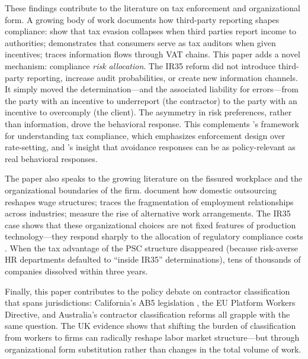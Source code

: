 \documentclass[12pt]{article}
\begin{document}
These findings contribute to the literature on tax enforcement and organizational form. A growing body of work documents how third-party reporting shapes compliance: \citet{kleven2011} show that tax evasion collapses when third parties report income to authorities; \citet{naritomi2019} demonstrates that consumers serve as tax auditors when given incentives; \citet{pomeranz2015} traces information flows through VAT chains. This paper adds a novel mechanism: compliance \textit{risk allocation}. The IR35 reform did not introduce third-party reporting, increase audit probabilities, or create new information channels. It simply moved the determination---and the associated liability for errors---from the party with an incentive to underreport (the contractor) to the party with an incentive to overcomply (the client). The asymmetry in risk preferences, rather than information, drove the behavioral response. This complements \citet{slemrod2019}'s framework for understanding tax compliance, which emphasizes enforcement design over rate-setting, and \citet{chetty2009}'s insight that avoidance responses can be as policy-relevant as real behavioral responses.

The paper also speaks to the growing literature on the fissured workplace and the organizational boundaries of the firm. \citet{goldschmidt2017} document how domestic outsourcing reshapes wage structures; \citet{weil2014} traces the fragmentation of employment relationships across industries; \citet{katz2019} measure the rise of alternative work arrangements. The IR35 case shows that these organizational choices are not fixed features of production technology---they respond sharply to the allocation of regulatory compliance costs \citep[see also][on the elasticity of organizational form to tax incentives]{djankov2010}. When the tax advantage of the PSC structure disappeared (because risk-averse HR departments defaulted to ``inside IR35'' determinations), tens of thousands of companies dissolved within three years.

Finally, this paper contributes to the policy debate on contractor classification that spans jurisdictions: California's AB5 legislation \citep{freedman2023}, the EU Platform Workers Directive, and Australia's contractor classification reforms all grapple with the same question. The UK evidence shows that shifting the burden of classification from workers to firms can radically reshape labor market structure---but through organizational form substitution rather than changes in the total volume of work.
\end{document}
